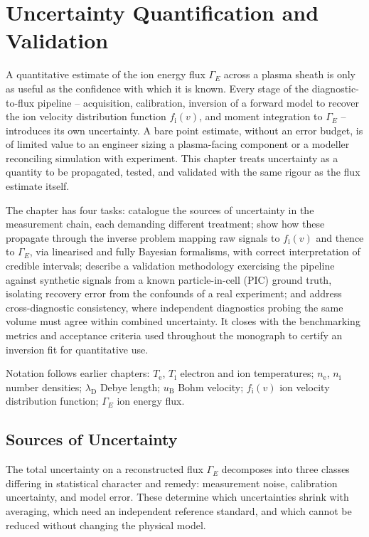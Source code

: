 \chapter{Uncertainty Quantification and Validation}
\label{ch:uq}

A quantitative estimate of the ion energy flux $\Gamma_{E}$ across a plasma sheath is only as useful as the confidence with which it is known. Every stage of the diagnostic-to-flux pipeline -- acquisition, calibration, inversion of a forward model to recover the ion velocity distribution function $f_{\mathrm{i}}(v)$, and moment integration to $\Gamma_{E}$ -- introduces its own uncertainty. A bare point estimate, without an error budget, is of limited value to an engineer sizing a plasma-facing component or a modeller reconciling simulation with experiment. This chapter treats uncertainty as a quantity to be propagated, tested, and validated with the same rigour as the flux estimate itself.

The chapter has four tasks: catalogue the sources of uncertainty in the measurement chain, each demanding different treatment; show how these propagate through the inverse problem mapping raw signals to $f_{\mathrm{i}}(v)$ and thence to $\Gamma_{E}$, via linearised and fully Bayesian formalisms, with correct interpretation of credible intervals; describe a validation methodology exercising the pipeline against synthetic signals from a known particle-in-cell (PIC) ground truth, isolating recovery error from the confounds of a real experiment; and address cross-diagnostic consistency, where independent diagnostics probing the same volume must agree within combined uncertainty. It closes with the benchmarking metrics and acceptance criteria used throughout the monograph to certify an inversion fit for quantitative use.

Notation follows earlier chapters: $T_{\mathrm{e}}$, $T_{\mathrm{i}}$ electron and ion temperatures; $n_{\mathrm{e}}$, $n_{\mathrm{i}}$ number densities; $\lambda_{\mathrm{D}}$ Debye length; $u_{\mathrm{B}}$ Bohm velocity; $f_{\mathrm{i}}(v)$ ion velocity distribution function; $\Gamma_{E}$ ion energy flux.

\section{Sources of Uncertainty}
\label{sec:uq-sources}

The total uncertainty on a reconstructed flux $\Gamma_{E}$ decomposes into three classes differing in statistical character and remedy: measurement noise, calibration uncertainty, and model error. These determine which uncertainties shrink with averaging, which need an independent reference standard, and which cannot be reduced without changing the physical model.

